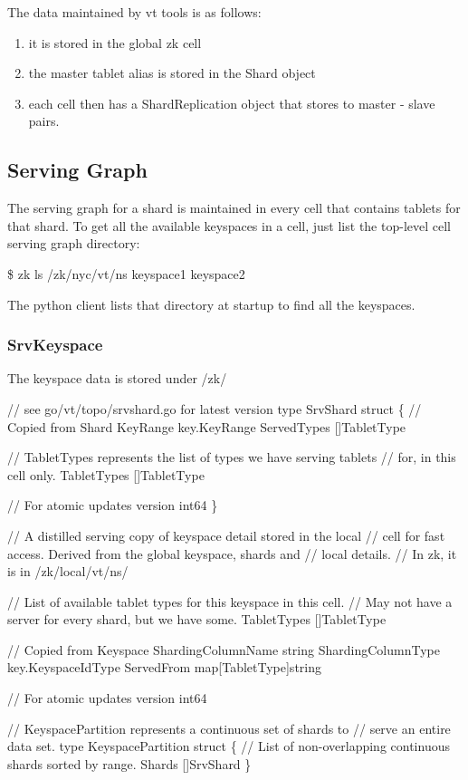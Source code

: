 The data maintained by vt tools is as follows:
\begin{enumerate}
\item it is stored in the global zk cell
\item the master tablet alias is stored in the Shard object
\item each cell then has a ShardReplication object that stores to master - slave pairs.
\end{enumerate}

\subsection{Serving Graph}

The serving graph for a shard is maintained in every cell that contains tablets for that shard. To get all the available keyspaces in a cell, just list the top-level cell serving graph directory:

\begin{codesample2}
  \$ zk ls /zk/nyc/vt/ns
  keyspace1
  keyspace2
\end{codesample2}

The python client lists that directory at startup to find all the keyspaces.

\subsubsection{SrvKeyspace}

The keyspace data is stored under /zk/
\begin{codesample2}
  // see go/vt/topo/srvshard.go for latest version
  type SrvShard struct \{
      // Copied from Shard
      KeyRange    key.KeyRange
      ServedTypes []TabletType
  
      // TabletTypes represents the list of types we have serving tablets
      // for, in this cell only.
      TabletTypes []TabletType
  
      // For atomic updates
      version int64
      \}
  
  // A distilled serving copy of keyspace detail stored in the local
  // cell for fast access. Derived from the global keyspace, shards and
  // local details.
  // In zk, it is in /zk/local/vt/ns/
  
      // List of available tablet types for this keyspace in this cell.
      // May not have a server for every shard, but we have some.
      TabletTypes []TabletType
  
      // Copied from Keyspace
      ShardingColumnName string
      ShardingColumnType key.KeyspaceIdType
      ServedFrom         map[TabletType]string
  
      // For atomic updates
      version int64
  
  
  // KeyspacePartition represents a continuous set of shards to
  // serve an entire data set.
  type KeyspacePartition struct \{
          // List of non-overlapping continuous shards sorted by range.
          Shards []SrvShard
  \}
\end{codesample2}

